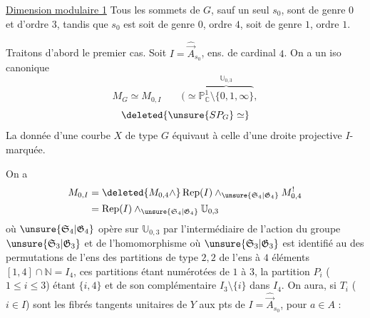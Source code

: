 \uline{Dimension modulaire 1} Tous les sommets de $G$, sauf un seul $s_0$, sont de genre $0$ et d'ordre $3$, tandis que $s_0$ est soit de genre $0$, ordre $4$, soit de genre $1$, ordre $1$.


Traitons d'abord le premier cas. Soit $I=\widehat{\vec A}_{s_0}$, ens. de cardinal $4$. On a un iso canonique
\[
M_G\simeq M_{0,I}\qquad
(\simeq\overbrace{\mathbb{P}^1_{\mathbb{C}}\setminus\{0,1,\infty\}}^{\mathbb{U}_{0,3}},
\]
\[
\deleted{\unsure{SP_G}\simeq}
\]
La donnée d'une courbe $X$ de type $G$ équivaut à celle d'une  droite projective  $I$-marquée.

On a
\[
\begin{aligned}
M_{0,I}&=\deleted{M_{0,4}\wedge}\operatorname{Rep}(I)\wedge_{\unsure{\mathfrak{S}_4|\mathfrak{G}_4}}M^!_{0,4}\\
&=\operatorname{Rep}(I)\wedge_{\unsure{\mathfrak{S}_4|\mathfrak{G}_4}}\mathbb{U}_{0,3}
\end{aligned}
\]
où $\unsure{\mathfrak{S}_4|\mathfrak{G}_4}$ opère sur $\mathbb{U}_{0,3}$ par l'intermédiaire de l'action du groupe $\unsure{\mathfrak{S}_3|\mathfrak{G}_3}$ et de l'homomorphisme
où $\unsure{\mathfrak{S}_3|\mathfrak{G}_3}$ est identifié au   des permutations de l'ens des partitions de type $2,2$ de l'ens à $4$ éléments $[1,4]\cap\mathbb{N}=I_4$, ces partitions étant numérotées de $1$ à $3$, la partition \uline{$P_i$} ($1\leq i\leq3$) étant  $\{i,4\}$ et de son complémentaire  $I_3\setminus\{i\}$ dans $I_4$. On aura, si $T_i$ ($i\in I$) sont les fibrés tangents unitaires de $Y$ aux pts de $I=\widehat{\vec A}_{s_0}$, pour  $a\in A$ :
